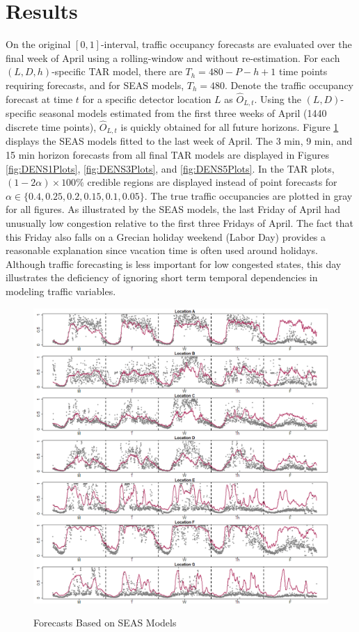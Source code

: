 \section{Results}
\label{sec:trafficresults}
On the original $[0,1]$-interval, traffic occupancy forecasts are evaluated over the final week of April using a rolling-window and without re-estimation. For each $(L,D,h)$-specific TAR model, there are $T_h=480-P-h+1$ time points requiring forecasts, and for SEAS models, $T_h=480$. Denote the traffic occupancy forecast at time $t$ for a specific detector location $L$ as $\hat{O}_{L,t}$. Using the $(L,D)$-specific seasonal models estimated from the first three weeks of April (1440 discrete time points), $\hat{O}_{L,t}$ is quickly obtained for all future horizons. Figure \ref{fig:SEASESTPlots} displays the SEAS models fitted to the last week of April. The 3 min, 9 min, and 15 min horizon forecasts from all final TAR models are displayed in Figures \ref{fig:DENS1Plots}, \ref{fig:DENS3Plots}, and \ref{fig:DENS5Plots}. In the TAR plots, $(1-2\alpha)\times 100\%$ credible regions are displayed instead of point forecasts for $\alpha \in \{0.4,0.25,0.2,0.15,0.1,0.05\}$. The true traffic occupancies are plotted in gray for all figures. As illustrated by the SEAS models, the last Friday of April had unusually low congestion relative to the first three Fridays of April. The fact that this Friday also falls on a Grecian holiday weekend (Labor Day) provides a reasonable explanation since vacation time is often used around holidays. Although traffic forecasting is less important for low congested states, this day illustrates the deficiency of ignoring short term temporal dependencies in modeling traffic variables. 

\begin{figure}[ht!]
\caption{Forecasts Based on SEAS Models}
\includegraphics[width=\textwidth]{SEASESTPlots}
\label{fig:SEASESTPlots}
\end{figure}

